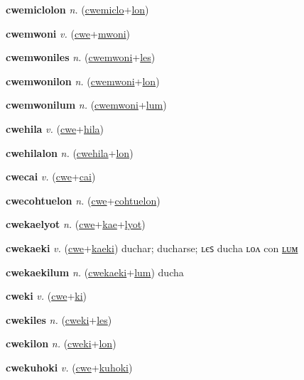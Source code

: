 \textbf{\hypertarget{cwemiclolon}{cwemiclolon}} \textit{n.} (\hyperlink{cwemiclo}{cwemiclo}+\allowbreak \hyperlink{lon}{lon})


\textbf{\hypertarget{cwemwoni}{cwemwoni}} \textit{v.} (\hyperlink{cwe}{cwe}+\allowbreak \hyperlink{mwoni}{mwoni})


\textbf{\hypertarget{cwemwoniles}{cwemwoniles}} \textit{n.} (\hyperlink{cwemwoni}{cwemwoni}+\allowbreak \hyperlink{les}{les})


\textbf{\hypertarget{cwemwonilon}{cwemwonilon}} \textit{n.} (\hyperlink{cwemwoni}{cwemwoni}+\allowbreak \hyperlink{lon}{lon})


\textbf{\hypertarget{cwemwonilum}{cwemwonilum}} \textit{n.} (\hyperlink{cwemwoni}{cwemwoni}+\allowbreak \hyperlink{lum}{lum})


\textbf{\hypertarget{cwehila}{cwehila}} \textit{v.} (\hyperlink{cwe}{cwe}+\allowbreak \hyperlink{hila}{hila})


\textbf{\hypertarget{cwehilalon}{cwehilalon}} \textit{n.} (\hyperlink{cwehila}{cwehila}+\allowbreak \hyperlink{lon}{lon})


\textbf{\hypertarget{cwecai}{cwecai}} \textit{v.} (\hyperlink{cwe}{cwe}+\allowbreak \hyperlink{cai}{cai})


\textbf{\hypertarget{cwecohtuelon}{cwecohtuelon}} \textit{n.} (\hyperlink{cwe}{cwe}+\allowbreak \hyperlink{cohtuelon}{cohtuelon})


\textbf{\hypertarget{cwekaelyot}{cwekaelyot}} \textit{n.} (\hyperlink{cwe}{cwe}+\allowbreak \hyperlink{kae}{kae}+\allowbreak \hyperlink{lyot}{lyot})


\textbf{\hypertarget{cwekaeki}{cwekaeki}} \textit{v.} (\hyperlink{cwe}{cwe}+\allowbreak \hyperlink{kaeki}{kaeki})
duchar; ducharse; ʟєꜱ ducha ʟᴏᴧ con \hyperlink{cwekaekilum}{ʟᴜᴍ}

\textbf{\hypertarget{cwekaekilum}{cwekaekilum}} \textit{n.} (\hyperlink{cwekaeki}{cwekaeki}+\allowbreak \hyperlink{lum}{lum})
ducha

\textbf{\hypertarget{cweki}{cweki}} \textit{v.} (\hyperlink{cwe}{cwe}+\allowbreak \hyperlink{ki}{ki})


\textbf{\hypertarget{cwekiles}{cwekiles}} \textit{n.} (\hyperlink{cweki}{cweki}+\allowbreak \hyperlink{les}{les})


\textbf{\hypertarget{cwekilon}{cwekilon}} \textit{n.} (\hyperlink{cweki}{cweki}+\allowbreak \hyperlink{lon}{lon})


\textbf{\hypertarget{cwekuhoki}{cwekuhoki}} \textit{v.} (\hyperlink{cwe}{cwe}+\allowbreak \hyperlink{kuhoki}{kuhoki})


